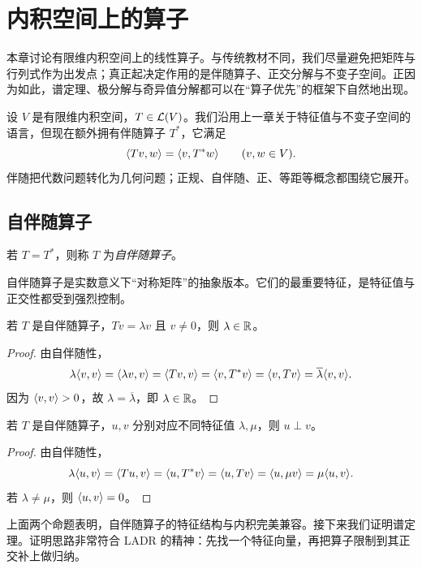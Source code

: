 \chapter{内积空间上的算子}

本章讨论有限维内积空间上的线性算子。与传统教材不同，我们尽量避免把矩阵与行列式作为出发点；真正起决定作用的是伴随算子、正交分解与不变子空间。正因为如此，谱定理、极分解与奇异值分解都可以在“算子优先”的框架下自然地出现。

设 $V$ 是有限维内积空间，$T\in\mathcal{L}(V)$。我们沿用上一章关于特征值与不变子空间的语言，但现在额外拥有伴随算子 $T^*$，它满足
\[
\langle Tv, w \rangle=\langle v, T^*w \rangle\qquad(v,w\in V).
\]
伴随把代数问题转化为几何问题；正规、自伴随、正、等距等概念都围绕它展开。

\section{自伴随算子}

\begin{definition}
若 $T=T^*$，则称 $T$ 为\emph{自伴随算子}。
\end{definition}

自伴随算子是实数意义下“对称矩阵”的抽象版本。它们的最重要特征，是特征值与正交性都受到强烈控制。

\begin{proposition}
若 $T$ 是自伴随算子，$Tv=\lambda v$ 且 $v\neq 0$，则 $\lambda\in\mathbb{R}$。
\end{proposition}

\begin{proof}
由自伴随性，
\[
\lambda\langle v, v \rangle=\langle \lambda v, v \rangle=\langle Tv, v \rangle=\langle v, T^*v \rangle=\langle v, Tv \rangle=\overline{\lambda}\langle v, v \rangle.
\]
因为 $\langle v, v \rangle>0$，故 $\lambda=\overline{\lambda}$，即 $\lambda\in\mathbb{R}$。
\end{proof}

\begin{proposition}
若 $T$ 是自伴随算子，$u,v$ 分别对应不同特征值 $\lambda,\mu$，则 $u\perp v$。
\end{proposition}

\begin{proof}
由自伴随性，
\[
\lambda\langle u, v \rangle=\langle Tu, v \rangle=\langle u, T^*v \rangle=\langle u, Tv \rangle=\langle u, \mu v \rangle=\mu\langle u, v \rangle.
\]
若 $\lambda\neq\mu$，则 $\langle u, v \rangle=0$。
\end{proof}

上面两个命题表明，自伴随算子的特征结构与内积完美兼容。接下来我们证明谱定理。证明思路非常符合 LADR 的精神：先找一个特征向量，再把算子限制到其正交补上做归纳。


